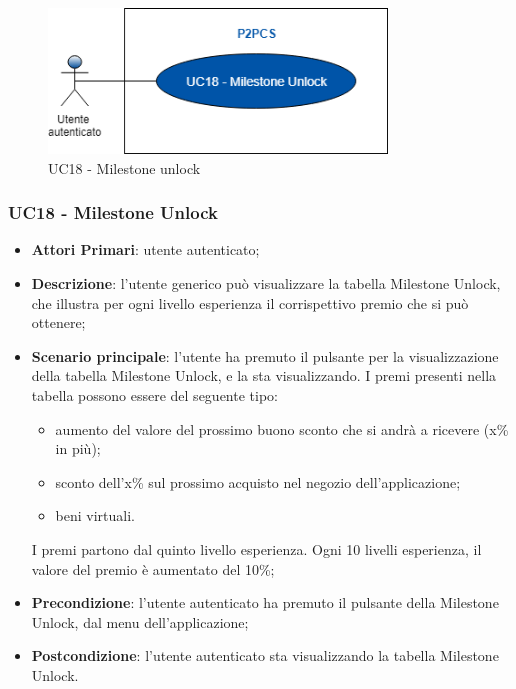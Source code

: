 \begin{figure}[h]
	\includegraphics[width=9cm]{res/images/uc20-21.png}
	\centering
	\caption{UC18 - Milestone unlock}
\end{figure}
\subsubsection{UC18 - Milestone Unlock}
\begin{itemize}
	\item \textbf{Attori Primari}: utente autenticato;
	\item \textbf{Descrizione}: l'utente generico può visualizzare la tabella Milestone Unlock\glo, che illustra per ogni livello esperienza il corrispettivo premio che si può ottenere;	
	\item \textbf{Scenario principale}: l'utente ha premuto il pulsante per la visualizzazione della tabella Milestone Unlock, e la sta visualizzando.
	I premi presenti nella tabella possono essere del seguente tipo:
	\begin{itemize}
		\item aumento del valore del prossimo buono sconto che si andrà a ricevere (x\% in più);
		\item sconto dell'x\% sul prossimo acquisto nel negozio dell'applicazione;
		\item beni virtuali.
	\end{itemize}
	I premi partono dal quinto livello esperienza.
	Ogni 10 livelli esperienza, il valore del premio è aumentato del 10\%;
	\item \textbf{Precondizione}: l'utente autenticato ha premuto il pulsante della Milestone Unlock, dal menu dell'applicazione;
	\item \textbf{Postcondizione}: l'utente autenticato sta visualizzando la tabella Milestone Unlock.
\end{itemize}
